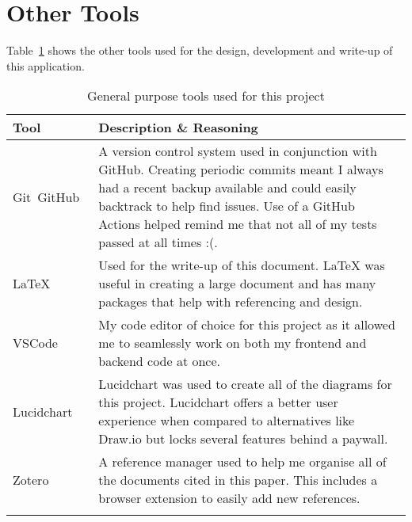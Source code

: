 \section{Other Tools}

Table~\ref{tab:tools-other} shows the other tools used for the design, development and write-up of this application.

\begin{longtable}{p{} p{}}
  \toprule
  \textbf{Tool} & \textbf{Description \& Reasoning}
  \\\midrule\midrule
  Git~\cite{noauthor_git_nodate}\newline GitHub~\cite{noauthor_github_nodate}
  & \small A version control system used in conjunction with GitHub. Creating periodic commits meant I always had a recent backup available and could easily backtrack to help find issues.
  Use of a GitHub Actions helped remind me that not all of my tests passed at all times :(.\\
  LaTeX~\cite{noauthor_latex_nodate}
  & \small Used for the write-up of this document. LaTeX was useful in creating a large document and has many packages that help with referencing and design.\\
  VSCode~\cite{noauthor_visual_nodate}
  & \small My code editor of choice for this project as it allowed me to seamlessly work on both my frontend and backend code at once. \\
  Lucidchart~\cite{noauthor_lucidchart_nodate}
  & \small Lucidchart was used to create all of the diagrams for this project. Lucidchart offers a better user experience when compared to alternatives like Draw.io but locks several features behind a paywall. \\
  Zotero~\cite{noauthor_zotero_nodat}
  & \small A reference manager used to help me organise all of the documents cited in this paper. This includes a browser extension to easily add new references.
  \\\bottomrule\bottomrule
  \caption{General purpose tools used for this project}
  \label{tab:tools-other}
\end{longtable}
